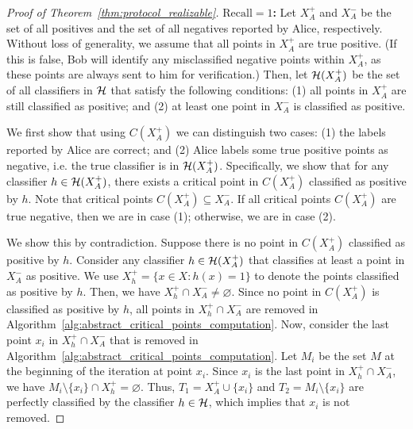 



\begin{proof}[Proof of Theorem~\ref{thm:protocol_realizable}]
    \textbf{$\mathrm{Recall} = 1$:} Let $X_A^+$ and $X_A^-$ be the set of all positives and the set of all negatives reported by Alice, respectively. 
    Without loss of generality, we assume that all points in $X_A^+$ are true positive. 
    (If this is false, Bob will identify any misclassified negative points within $X_A^+$, as these points are always sent to him for verification.)
    Then, let $\mathcal{H}(X_A^+)$ be the set of all classifiers in $\mathcal{H}$ that satisfy the following conditions: (1) all points in $X_A^+$ are still classified as positive; and (2) at least one point in $X_A^-$ is classified as positive. 
    
    We first show that using $C(X_A^+)$ we can distinguish two cases: (1) the labels reported by Alice are correct; and (2) Alice labels some true positive points as negative, i.e. the true classifier is in $\mathcal{H}(X_A^+)$. 
    Specifically, we show that for any classifier $h \in \mathcal{H}(X_A^+)$, there exists a critical point in $C(X_A^+)$ classified as positive by $h$. 
    Note that critical points $C(X_A^+) \subseteq X_A^-$. 
    If all critical points $C(X_A^+)$ are true negative, then we are in case (1); otherwise, we are in case (2).
    
    We show this by contradiction. Suppose there is no point in $C(X_A^+)$ classified as positive by $h$. 
    Consider any classifier $h \in \mathcal{H}(X_A^+)$ that classifies at least a point in $X_A^-$ as positive. We use $X_h^+ = \{x \in X: h(x) = 1\}$ to denote the points classified as positive by $h$. Then, we have $X_h^+ \cap X_A^- \neq \varnothing$. 
    Since no point in $C(X_A^+)$ is classified as positive by $h$, all points in $X_h^+ \cap X_A^-$ are removed in Algorithm~\ref{alg:abstract_critical_points_computation}. 
    Now, consider the last point $x_i$ in $X_h^+ \cap X_A^-$ that is removed in Algorithm~\ref{alg:abstract_critical_points_computation}. Let $M_i$ be the set $M$ at the beginning of the iteration at point $x_i$. Since $x_i$ is the last point in $X_h^+ \cap X_A^-$, we have $M_i \setminus \{x_i\} \cap X_h^+ = \varnothing$. Thus, $T_1 = X_A^+ \cup \{x_i\}$ and $T_2 = M_i \setminus \{x_i\}$ are perfectly classified by the classifier $h \in \mathcal{H}$, which implies that $x_i$ is not removed. 


\end{proof}
